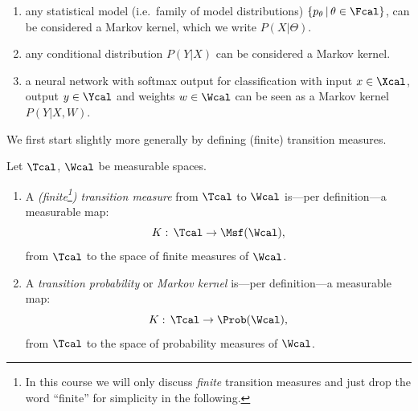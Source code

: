 \begin{Eg}
    \begin{enumerate}
        \item any statistical model (i.e.\ family of model distributions) $\{p_\theta \,|\, \theta \in \Fcal\}$, can 
            be considered a Markov kernel, which we write $P(X|\Theta)$.
        \item any conditional distribution $P(Y|X)$ can be considered a Markov kernel.
        \item a neural network with softmax output for classification with 
            input $x \in \Xcal$, output $y \in \Ycal$ and weights $w \in \Wcal$ can be seen as a Markov kernel $P(Y|X,W)$.

    \end{enumerate}
\end{Eg}


We first start slightly more generally by defining (finite) transition measures.

\begin{Def}
    \label{def-transition-measure}
    Let $\Tcal$, $\Wcal$ be measurable spaces.
    \begin{enumerate}
        \item A \emph{(finite\footnote{In this course we will only discuss \emph{finite} transition measures and just drop the word ``finite'' for simplicity in the following.}) transition measure}  from $\Tcal$ to $\Wcal$
    is---per definition---a measurable map:
    \[ K:\, \Tcal \to \Msf(\Wcal), \]
        from $\Tcal$ to the space of finite measures of $\Wcal$.
    \item A \emph{transition probability} or \emph{Markov kernel} is---per definition---a measurable map:
    \[ K:\, \Tcal \to \Prob(\Wcal), \]
    from $\Tcal$ to the space of probability measures of $\Wcal$.
    \end{enumerate}
\end{Def}

